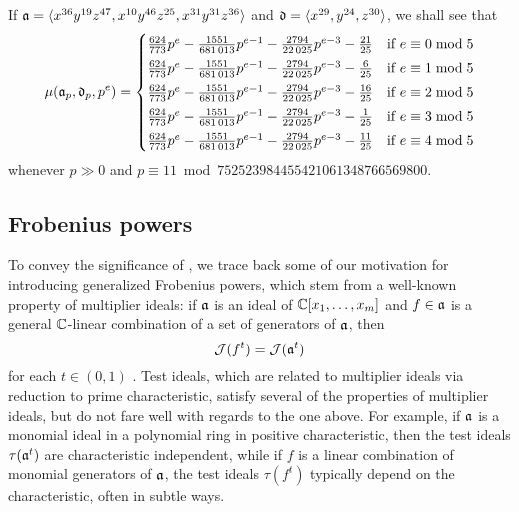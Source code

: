 \documentclass{article}
\begin{document}
\begin{example}
   \label{ex2 intro}
   If $\mathfrak{a} = \langle x^{36} y^{19} z^{47}, x^{10} y^{46} z^{25}, x^{31} y^{31} z^{36} \rangle$ and $\mathfrak{d} = \langle x^{29},y^{24},z^{30} \rangle$, we shall see that
   \[
    \mu(\mathfrak{a}_p,\mathfrak{d}_p,p^e) =
    \begin{cases}
       \frac{624}{773}p^{e} - \frac{\num{1551}}{\num{681013}}p^{e-1} - \frac{\num{2794}}{\num{22025}}p^{e-3} - \frac{21}{25} & \text{if $e \equiv 0 \bmod 5$}\\[1mm]
       \frac{624}{773}p^{e} - \frac{\num{1551}}{\num{681013}}p^{e-1} - \frac{\num{2794}}{\num{22025}}p^{e-3} - \frac{6}{25} & \text{if $e \equiv 1 \bmod 5$}\\[1mm]
       \frac{624}{773}p^{e} - \frac{\num{1551}}{\num{681013}}p^{e-1} - \frac{\num{2794}}{\num{22025}}p^{e-3} - \frac{16}{25} & \text{if $e \equiv 2 \bmod 5$}\\[1mm]
       \frac{624}{773}p^{e} - \frac{\num{1551}}{\num{681013}}p^{e-1} - \frac{\num{2794}}{\num{22025}}p^{e-3} - \frac{1}{25} & \text{if $e \equiv 3 \bmod 5$}\\[1mm]
       \frac{624}{773}p^{e} - \frac{\num{1551}}{\num{681013}}p^{e-1} - \frac{\num{2794}}{\num{22025}}p^{e-3} - \frac{11}{25} & \text{if $e \equiv 4 \bmod 5$}
    \end{cases}
 \]
 whenever $p \gg 0$  and $p \equiv 11 \bmod \num{752523984455421061348766569800}$.
\end{example}

\subsection{Frobenius powers}
To convey the significance of , we trace back some of our motivation for introducing generalized Frobenius powers, which stem from a well-known property of multiplier ideals:
if $\mathfrak{a}$ is an ideal of $\mathbb{C}[x_1,\ldots,x_m]$ and $f \in \mathfrak{a}$ is a general $\mathbb{C}$-linear combination of a set of generators of $\mathfrak{a}$, then
\[ \mathcal{J}(f^t) = \mathcal{J}(\mathfrak{a}^t)\]
for each $t \in (0,1)$ \cite[Proposition~9.2.28]{lazarsfeld.positivity-II}.
Test ideals, which are related to multiplier ideals via reduction to prime characteristic, satisfy several of the properties of multiplier ideals, but do not fare well with regards to the one above. 
For example, if $\mathfrak{a}$ is a monomial ideal in a polynomial ring in positive characteristic, then the test ideals $\tau(\mathfrak{a}^t)$ are characteristic independent, while if $f$ is a linear combination of monomial generators of $\mathfrak{a}$, the test ideals $\tau(f^t)$ typically depend on the characteristic, often in subtle ways.
\end{document}
